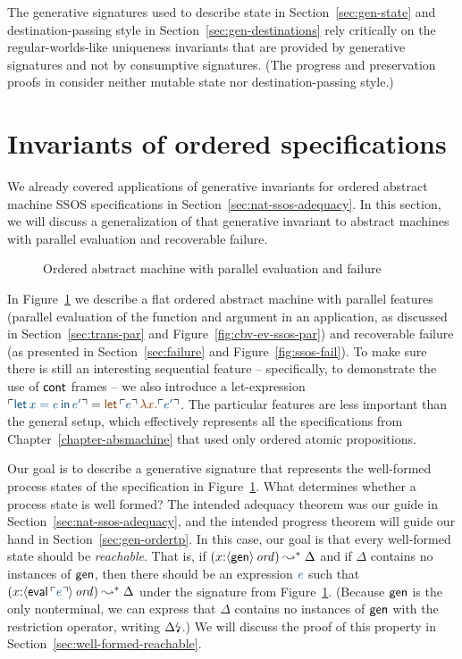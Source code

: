 The generative signatures used to describe state in
Section~\ref{sec:gen-state} and destination-passing style in
Section~\ref{sec:gen-destinations} rely critically on the
regular-worlds-like uniqueness invariants that are provided by
generative signatures and not by consumptive signatures. (The progress
and preservation proofs in \cite{simmons10type} consider neither
mutable state nor destination-passing style.)

\section{Invariants of ordered specifications}
\label{sec:gen-order}

We already covered applications of generative invariants for ordered
abstract machine SSOS specifications in
Section~\ref{sec:nat-ssos-adequacy}. In this section, we will discuss
a generalization of that generative invariant to abstract machines
with parallel evaluation and recoverable failure.


\begin{figure}[t]
\caption{Ordered abstract machine with parallel evaluation and failure}
\label{fig:gen-order-prog}
\end{figure}

In Figure~\ref{fig:gen-order-prog} we describe a flat ordered abstract
machine with parallel features (parallel evaluation of the function
and argument in an application, as discussed in
Section~\ref{sec:trans-par} and Figure~\ref{fig:cbv-ev-ssos-par}) and
recoverable failure (as presented in Section~\ref{sec:failure} and
Figure~\ref{fig:ssos-fail}). To make sure there is still an
interesting sequential feature -- specifically, to demonstrate the use
of ${\sf cont}$ frames -- we also introduce a let-expression
$\interp{{\sf let}\,x = e\,{\sf in}\,e'} = \lf{{\sf
    let}\,\interp{e}\,\lambda x.\interp{e'}}$. The particular features
are less important than the general setup, which effectively
represents all the specifications from
Chapter~\ref{chapter-absmachine} that used only ordered atomic
propositions.


Our goal is to describe a generative signature that represents the
well-formed process states of the specification in
Figure~\ref{fig:gen-order-prog}. What determines whether a process
state is well formed? The intended adequacy theorem was our guide in
Section~\ref{sec:nat-ssos-adequacy}, and the intended progress theorem
will guide our hand in Section~\ref{sec:gen-ordertp}. In this case,
our goal is that every well-formed state should be {\it
  reachable}. That is, if $(x{:}{\langle {\sf gen} \rangle}\,{{\it ord}})
\leadsto^* \Delta$ and if $\Delta$ contains no
instances of ${\sf gen}$, then there should be an expression $\obj{e}$
such that $(x{:}\istrue{\susp{{\sf eval}\,\interp{e}}}) \leadsto^*
\Delta$ under the signature from
Figure~\ref{fig:gen-order-prog}. (Because ${\sf gen}$ is the only
nonterminal, we can express that $\Delta$ contains no instances of
${\sf gen}$ with the restriction operator, writing
${\Delta}{\mbox{\lightning}}_{}$.) We will discuss the proof of this property
in Section~\ref{sec:well-formed-reachable}.


